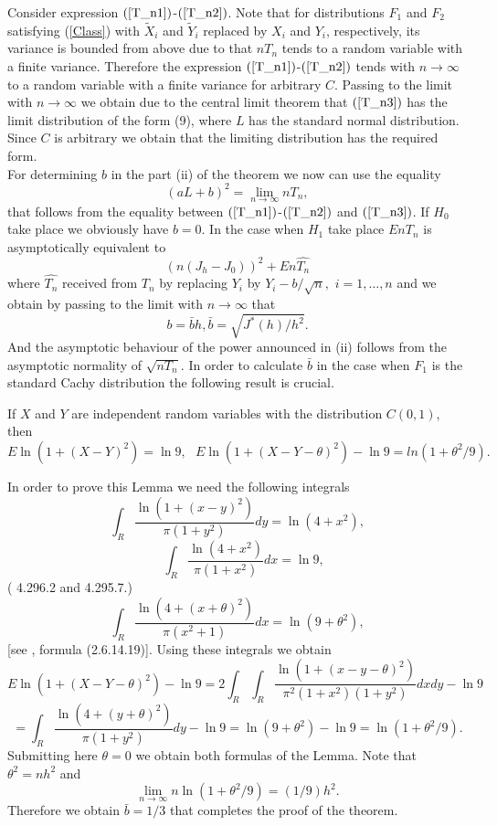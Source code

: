 \documentclass{svproc}
\begin{document}
Consider expression $(\ref{T_n1})$-$(\ref{T_n2})$. Note  that for distributions $F_1$ and $F_2$  satisfying (\ref{Class}) with $\tilde X_i$ and $\tilde Y_i$ replaced by $X_i$ and $Y_i$, respectively, its variance is bounded from above due to  that $nT_n$ tends to a random variable with a finite variance. Therefore  the expression $(\ref{T_n1})$-$(\ref{T_n2})$ tends with $n\to \infty$ to a random variable with a finite variance for arbitrary $C$.
Passing to the limit with $n\to \infty$ we obtain due to the central limit theorem that $(\ref{T_n3})$ has the limit distribution of the form (9), where  $L$ has the standard normal distribution.  Since $C$ is arbitrary we obtain that the limiting distribution has the required form. \\
For determining $b$ in the part (ii) of the theorem  we now can use the equality
 \begin{equation}\label{identity}
 (aL+b)^2=\lim_{n \to \infty}
 nT_n,
 \end{equation}
 that follows from  the equality between $(\ref{T_n1})$-$(\ref{T_n2})$ and $(\ref{T_n3})$. If $H_0$ take place we obviously have $b=0$. In the case when $H_1$ take place $EnT_n$ is asymptotically equivalent to  
$$
(n(J_h - J_0))^2+En\hat{T_n}
$$
where $\hat{T_n}$ received from $T_n$ by replacing  $Y_i$ by $Y_i - b/\sqrt{n},$ $i=1,\dots,n$
and we obtain by passing to the limit with $n\to\infty$ that 
$$
b= \bar bh, 
\bar b =\sqrt{J^*(h)/h^2}.
$$ 
 And the asymptotic behaviour of the power announced in (ii) follows from the asymptotic normality of $\sqrt{nT_n}$.
In order to calculate $\bar b$ in the case when $F_1$ is the standard Cachy distribution
 the following result is crucial.
\begin{lemma}If $X$ and $Y$ are independent random variables with the distribution
$C(0,1)$, then
$$
 E \ln(1+ (X- Y)^2)= \ln 9,\,\,\,\,
 E \ln(1+ (X- Y - \theta)^2)-\ln 9
 =
ln(1+ \theta^2/9).
$$
\end{lemma}
In order to prove this Lemma we need the following integrals
$$
\int_{R}
\frac {\ln(1+(x-y)^2)}{\pi(1+y^2)} dy = \ln(4+x^2),
$$
$$
\quad \int_{R} \frac {\ln(4+x^2)}{\pi(1+x^2)} dx = \ln 9,
$$
(\cite{GradRyzh2007}  4.296.2 and 4.295.7.)
$$
\int_{R} \frac{\ln(4 +(x +\theta)^2 )}{\pi(x^2 +1)} dx = \ln(9+\theta^2),
$$
[see  \cite{PrudBrychMarich1981}, formula (2.6.14.19)].
Using these integrals we obtain
$$
 E \ln(1+ (X- Y - \theta)^2)-\ln 9  = 2\int_{R} \int_{R} \frac{\ln(1+(x-y-\theta)^2)}{\pi^2(1+x^2)(1+y^2)} dx dy -\ln 9
$$
$$
= \int_{R}\frac{\ln(4 +(y+\theta)^2)}{\pi(1+y^2)} dy- \ln 9= \ln(9+\theta^2) -\ln 9 = \ln(1+ \theta^2/9).
$$
Submitting here  $\theta=0$ we obtain both formulas of the Lemma.
Note that $\theta^2=nh^2$ and
$$
\lim_{n\to \infty} n \ln(1+ \theta^2/9)= (1/9)h^2.
$$
Therefore we obtain $\bar b = 1/3$ that completes the proof of the theorem.
\end{document}
